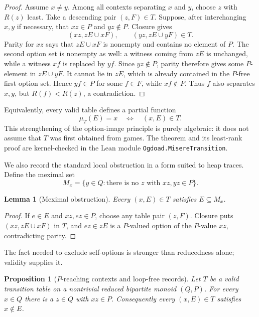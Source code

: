 \documentclass[11pt]{article}
\newtheorem{proposition}[theorem]{Proposition}
\newtheorem{lemma}[theorem]{Lemma}
\theoremstyle{definition}
\theoremstyle{remark}
\begin{document}
\begin{proof}
Assume $x\ne y$.  Among all contexts separating $x$ and $y$, choose $z$
with $R(z)$ least.  Take a descending pair $(z,F)\in T$.  Suppose, after
interchanging $x,y$ if necessary, that $xz\in P$ and $yz\notin P$.
Closure gives
\[
 (xz,zE\cup xF),\qquad (yz,zE\cup yF)\in T.
\]
Parity for $xz$ says that $zE\cup xF$ is nonempty and contains no element
of $P$.  The second option set is nonempty as well: a witness coming from
$zE$ is unchanged, while a witness $xf$ is replaced by $yf$.
Since $yz\notin P$, parity therefore gives some $P$-element in
$zE\cup yF$.  It cannot lie in $zE$, which is already contained in the
$P$-free first option set.  Hence $yf\in P$ for some $f\in F$, while
$xf\notin P$.  Thus $f$ also separates $x,y$, but $R(f)<R(z)$, a
contradiction.
\end{proof}

Equivalently, every valid table defines a partial function
\begin{equation}
 \mu_T(E)=x\quad\Longleftrightarrow\quad (x,E)\in T.
\end{equation}
This strengthening of the option-image principle is purely algebraic: it
does not assume that $T$ was first obtained from games.  The theorem and its
least-rank proof are kernel-checked in the Lean module
\texttt{Ogdoad.MisereTransition}.

We also record the standard local obstruction in a form suited to heap
traces.  Define the meximal set
\[
 M_x=\{y\in Q:\text{there is no }z\text{ with }xz,yz\in P\}.
\]

\begin{lemma}[Meximal obstruction]\label{lem:meximal}
Every $(x,E)\in T$ satisfies $E\subseteq M_x$.
\end{lemma}

\begin{proof}
If $e\in E$ and $xz,ez\in P$, choose any table pair $(z,F)$.  Closure puts
$(xz,zE\cup xF)$ in $T$, and $ez\in zE$ is a $P$-valued option of the
$P$-value $xz$, contradicting parity.
\end{proof}

The fact needed to exclude self-options is stronger than reducedness alone;
validity supplies it.

\begin{proposition}[$P$-reaching contexts and loop-free records]
\label{prop:noself}
Let $T$ be a valid transition table on a nontrivial reduced bipartite monoid
$(Q,P)$.  For every $x\in Q$ there is a $z\in Q$ with $xz\in P$.
Consequently every $(x,E)\in T$ satisfies $x\notin E$.
\end{proposition}
\end{document}
